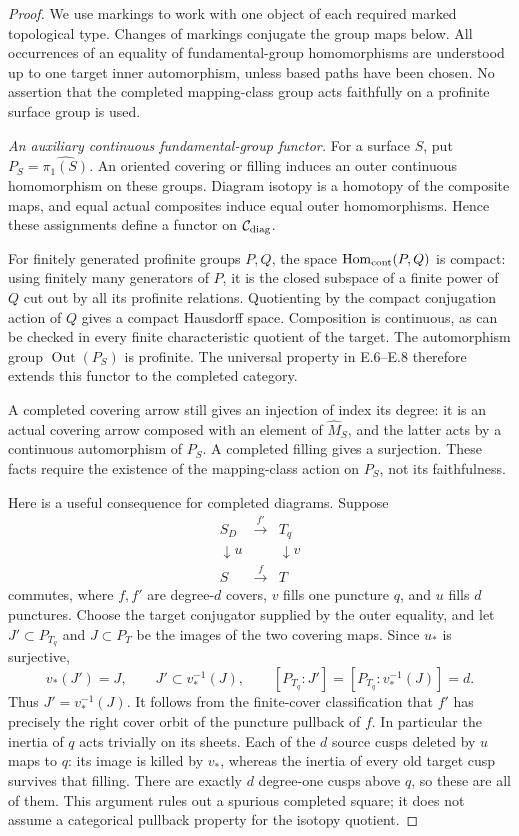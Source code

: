 \begin{proof}
We use markings to work with one object of each required marked
topological type. Changes of markings conjugate the group maps below.
All occurrences of an equality of fundamental-group homomorphisms are
understood up to one target inner automorphism, unless based paths have
been chosen. No assertion that the completed mapping-class group acts
faithfully on a profinite surface group is used.

\emph{An auxiliary continuous fundamental-group functor.}
For a surface $S$, put $P_S=\widehat{\pi_1(S)}$. An oriented covering
or filling induces an outer continuous homomorphism on these groups.
Diagram isotopy is a homotopy of the composite maps, and equal actual
composites induce equal outer homomorphisms. Hence these assignments
define a functor on $\mathcal C_{\rm diag}$.

For finitely generated profinite groups $P,Q$, the space
$\operatorname{Hom}_{\rm cont}(P,Q)$ is compact: using finitely many
generators of $P$, it is the closed subspace of a finite power of $Q$
cut out by all its profinite relations. Quotienting by the compact
conjugation action of $Q$ gives a compact Hausdorff space. Composition
is continuous, as can be checked in every finite characteristic
quotient of the target. The automorphism group
$\operatorname{Out}(P_S)$ is profinite. The universal property in E.6--E.8
therefore extends this functor to the completed category.

A completed covering arrow still gives an injection of index its degree:
it is an actual covering arrow composed with an element of
$\widehat M_S$, and the latter acts by a continuous automorphism of
$P_S$. A completed filling gives a surjection. These facts require the
existence of the mapping-class action on $P_S$, not its faithfulness.

Here is a useful consequence for completed diagrams. Suppose
\[
\begin{array}{ccc}
 S_D&\xrightarrow{\ f'\ }&T_q\\
 \downarrow u&&\downarrow v\\
 S&\xrightarrow{\ f\ }&T
\end{array}                                                     \tag{E.13.1}
\]
commutes, where $f,f'$ are degree-$d$ covers, $v$ fills one puncture
$q$, and $u$ fills $d$ punctures. Choose the target conjugator supplied
by the outer equality, and let $J'\subset P_{T_q}$ and $J\subset P_T$
be the images of the two covering maps. Since $u_*$ is surjective,
\[
 v_*(J')=J,
 \qquad J'\subset v_*^{-1}(J),
 \qquad [P_{T_q}:J']=[P_{T_q}:v_*^{-1}(J)]=d.
\]
Thus $J'=v_*^{-1}(J)$. It follows from the finite-cover classification
that $f'$ has precisely the right cover orbit of the puncture pullback
of $f$. In particular the inertia of $q$ acts trivially on its sheets.
Each of the $d$ source cusps deleted by $u$ maps to $q$: its image is
killed by $v_*$, whereas the inertia of every old target cusp survives
that filling. There are exactly $d$ degree-one cusps above $q$, so these
are all of them. This argument rules out a spurious completed square;
it does not assume a categorical pullback property for the isotopy
quotient.


\end{proof}
